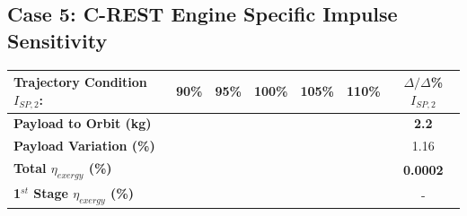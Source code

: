 \subsection{Case 5: C-REST Engine Specific Impulse Sensitivity}\label{sec:ispsensitivitynoflyback}

\begin{table}[ht!]
	\centering
	\begin{tabular}{l c c c c c c} 
		\hline \textbf{Trajectory Condition}   \qquad  $I_{SP,2}$:
		&90\%
		&95\%
		&100\%
		&105\%
		&110\%
		& $\Delta/\Delta$\%$I_{SP,2}$
		\\
		\hline \textbf{Payload to Orbit (kg)}
		& \textbf{\PayloadToOrbitIspNinetyNoReturn}
		& \textbf{\PayloadToOrbitIspNinetyFiveNoReturn}
		& \textbf{\PayloadToOrbitIspStandardNoReturn}
		& \textbf{\PayloadToOrbitIspOneHundredFiveNoReturn}
		& \textbf{\PayloadToOrbitIspOneHundredTenNoReturn}
		&\textbf{2.2}
		\\
		\textbf{Payload Variation (\%)}
		& \PayloadVarIspNinetyNoReturn
		& \PayloadVarIspNinetyFiveNoReturn
		& \PayloadVarIspStandardNoReturn
		& \PayloadVarIspOneHundredFiveNoReturn
		& \PayloadVarIspOneHundredTenNoReturn
		&1.16
		\\
		\textbf{Total $\eta_{exergy}$ (\%)}
		& \textbf{\totalExergyEffIspNinetyNoReturn}
		& \textbf{\totalExergyEffIspNinetyFiveNoReturn}
		& \textbf{\totalExergyEffIspStandardNoReturn}
		& \textbf{\totalExergyEffIspOneHundredFiveNoReturn}
		& \textbf{\totalExergyEffIspOneHundredTenNoReturn}
		& \textbf{0.0002}
		\\
		\hline 
		\textbf{1$^{st}$ Stage $\eta_{exergy}$ (\%)}
		& \textbf{\firstExergyEffIspNinetyNoReturn}
		& \textbf{\firstExergyEffIspNinetyFiveNoReturn}
		& \textbf{\firstExergyEffIspStandardNoReturn}
		& \textbf{\firstExergyEffIspOneHundredFiveNoReturn}
		& \textbf{\firstExergyEffIspOneHundredTenNoReturn}
		& -
		\\


\end{tabular}
\end{table}
